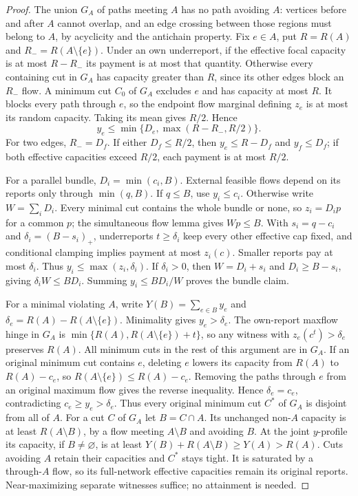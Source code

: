 \documentclass[11pt]{article}
\theoremstyle{definition}\newtheorem{definition}[theorem]{Definition}
\theoremstyle{remark}\newtheorem{remark}[theorem]{Remark}
\begin{document}
\begin{proof}
The union $G_A$ of paths meeting $A$ has no path avoiding $A$: vertices before
and after $A$ cannot overlap, and an edge crossing between those regions
must belong to $A$, by acyclicity and the antichain property.
Fix $e\in A$, put $R=R(A)$ and $R_-=R(A\setminus\{e\})$. Under an
own underreport, if the effective focal capacity is at most $R-R_-$ its
payment is at most that quantity. Otherwise every containing cut in $G_A$
has capacity greater than $R$, since its other edges block an $R_-$ flow.
A minimum cut $C_0$ of $G_A$ excludes $e$ and has capacity at most $R$.
It blocks every path through $e$, so the endpoint flow marginal defining
$z_e$ is at most its random capacity. Taking its mean gives $R/2$. Hence
\[
 y_e\le\min\{D_e,\max(R-R_-,R/2)\}.                 \tag{A}
\]
For two edges, $R_-=D_f$. If either $D_f\le R/2$, then
$y_e\le R-D_f$ and $y_f\le D_f$; if both effective capacities exceed
$R/2$, each payment is at most $R/2$.

For a parallel bundle, $D_i=\min(c_i,B)$. External feasible flows depend
on its reports only through $\min(q,B)$. If $q\le B$, use $y_i\le c_i$.
Otherwise write $W=\sum_iD_i$. Every minimal cut contains the whole bundle
or none, so $z_i=D_ip$ for a common $p$; the simultaneous flow lemma gives
$Wp\le B$. With $s_i=q-c_i$ and $\delta_i=(B-s_i)_+$, underreports
$t\ge\delta_i$ keep every other effective cap fixed, and conditional
clamping implies payment at most $z_i(c)$. Smaller reports pay at most
$\delta_i$. Thus $y_i\le\max(z_i,\delta_i)$. If $\delta_i>0$, then
$W=D_i+s_i$ and $D_i\ge B-s_i$, giving
$\delta_iW\le BD_i$. Summing $y_i\le BD_i/W$ proves the bundle claim.

For a minimal violating $A$, write $Y(B)=\sum_{e\in B}y_e$ and
$\delta_e=R(A)-R(A\setminus\{e\})$. Minimality gives $y_e>\delta_e$.
The own-report maxflow hinge in $G_A$ is
$\min\{R(A),R(A\setminus\{e\})+t\}$, so any witness with
$z_e(c^t)>\delta_e$ preserves $R(A)$. All minimum cuts in the rest of this argument are in
$G_A$. If an original minimum cut contains $e$, deleting $e$ lowers its
capacity from $R(A)$ to $R(A)-c_e$, so
$R(A\setminus\{e\})\le R(A)-c_e$. Removing the paths through $e$
from an original maximum flow gives the reverse inequality. Hence
$\delta_e=c_e$, contradicting $c_e\ge y_e>\delta_e$.
Thus every original minimum cut $C^*$ of $G_A$ is disjoint from all of $A$.
For a cut $C$ of $G_A$ let $B=C\cap A$. Its unchanged non-$A$ capacity is at least
$R(A\setminus B)$, by a flow meeting $A\setminus B$ and avoiding $B$.
At the joint $y$-profile its capacity, if $B\ne\varnothing$, is at least
$Y(B)+R(A\setminus B)\ge Y(A)>R(A)$. Cuts avoiding $A$ retain their
capacities and $C^*$ stays tight. It is saturated by a through-$A$ flow,
so its full-network effective capacities remain its original reports.
Near-maximizing separate witnesses suffice; no attainment is needed.
\end{proof}
\end{document}
